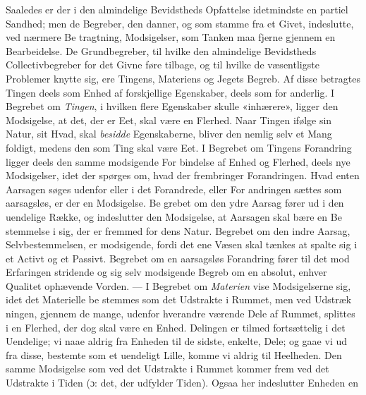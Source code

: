 \documentclass[12pt,a4paper]{book}
\begin{document}
Saaledes er der i den almindelige Bevidstheds Opfattelse
idetmindste en partiel Sandhed; men de Begreber, den danner,
og som stamme fra et Givet, indeslutte, ved nærmere Be\-%
tragtning, Modsigelser, som Tanken maa fjerne gjennem en
Bearbeidelse. De Grundbegreber, til hvilke den almindelige
Bevidstheds Collectivbegreber for det Givne føre tilbage, og
til hvilke de væsentligste Problemer knytte sig, ere Tingens,
Materiens og Jegets Begreb. Af disse betragtes Tingen
deels som Enhed af forskjellige Egenskaber, deels som for\-%
anderlig. I Begrebet om \emph{Tingen}, i hvilken flere Egenskaber
skulle «inhærere», ligger den Modsigelse, at det, der er Eet,
skal være en Flerhed. Naar Tingen ifølge sin Natur, sit Hvad,
skal \emph{besidde} Egenskaberne, bliver den nemlig selv et Mang\-%
foldigt, medens den som Ting skal være Eet. I Begrebet om
Tingens Forandring ligger deels den samme modsigende For\-%
bindelse af Enhed og Flerhed, deels nye Modsigelser, idet der
spørges om, hvad der frembringer Forandringen. Hvad enten
Aarsagen søges udenfor eller i det Forandrede, eller For\-%
andringen sættes som aarsagsløs, er der en Modsigelse. Be\-%
grebet om den ydre Aarsag fører ud i den uendelige Række,
og indeslutter den Modsigelse, at Aarsagen skal bære en Be\-%
stemmelse i sig, der er fremmed for dens Natur. Begrebet
om den indre Aarsag, Selvbestemmelsen, er modsigende, fordi
det ene Væsen skal tænkes at spalte sig i et Activt og et
Passivt. Begrebet om en aarsagsløs Forandring fører til det
mod Erfaringen stridende og sig selv modsigende Begreb om
en absolut, enhver Qualitet ophævende Vorden. --- I Begrebet
om \emph{Materien} vise Modsigelserne sig, idet det Materielle be\-%
stemmes som det Udstrakte i Rummet, men ved Udstræk\-%
ningen, gjennem de mange, udenfor hverandre værende Dele
af Rummet, splittes i en Flerhed, der dog skal være en
Enhed. Delingen er tilmed fortsættelig i det Uendelige; vi
naae aldrig fra Enheden til de sidste, enkelte, Dele; og gaae
vi ud fra disse, bestemte som et uendeligt Lille, komme vi
aldrig til Heelheden. Den samme Modsigelse som ved det
Udstrakte i Rummet kommer frem ved det Udstrakte i Tiden
(ɔ: det, der udfylder Tiden). Ogsaa her indeslutter Enheden en
\end{document}
